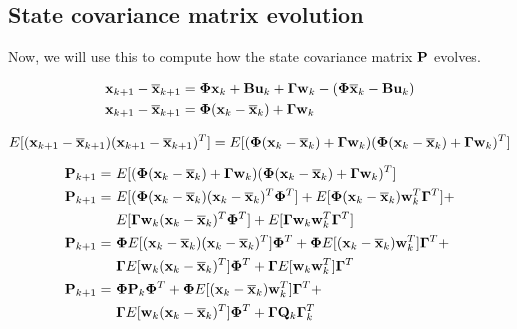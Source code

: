\subsection{State covariance matrix evolution}

Now, we will use this to compute how the \gls{state} covariance matrix $\mathbf{P}$
evolves.

\begin{align*}
  \mathbf{x}_{k+1} - \overline{\mathbf{x}}_{k+1} &= \mathbf{\Phi}\mathbf{x}_k +
    \mathbf{B}\mathbf{u}_k + \mathbf{\Gamma}\mathbf{w}_k - (\mathbf{\Phi}\overline{\mathbf{x}}_k -
    \mathbf{B}\mathbf{u}_k) \\
  \mathbf{x}_{k+1} - \overline{\mathbf{x}}_{k+1} &=
    \mathbf{\Phi}(\mathbf{x}_k - \overline{\mathbf{x}}_k) + \mathbf{\Gamma}\mathbf{w}_k
\end{align*}

\begin{equation*}
  E[(\mathbf{x}_{k+1} - \overline{\mathbf{x}}_{k+1})(\mathbf{x}_{k+1} - \overline{\mathbf{x}}_{k+1})^T] =
    E[(\mathbf{\Phi}(\mathbf{x}_k - \overline{\mathbf{x}}_k) + \mathbf{\Gamma}\mathbf{w}_k)
      (\mathbf{\Phi}(\mathbf{x}_k - \overline{\mathbf{x}}_k) + \mathbf{\Gamma}\mathbf{w}_k)^T]
\end{equation*}

\begin{align*}
  \mathbf{P}_{k+1} =~&
    E[(\mathbf{\Phi}(\mathbf{x}_k - \overline{\mathbf{x}}_k) + \mathbf{\Gamma}\mathbf{w}_k)
      (\mathbf{\Phi}(\mathbf{x}_k - \overline{\mathbf{x}}_k) + \mathbf{\Gamma}\mathbf{w}_k)^T] \\
  \mathbf{P}_{k+1} =~&
    E[(\mathbf{\Phi}(\mathbf{x}_k - \overline{\mathbf{x}}_k)(\mathbf{x}_k - \overline{\mathbf{x}}_k)^T
      \mathbf{\Phi}^T] +
    E[\mathbf{\Phi}(\mathbf{x}_k - \overline{\mathbf{x}}_k)\mathbf{w}_k^T\mathbf{\Gamma}^T] + \\
    &E[\mathbf{\Gamma}\mathbf{w}_k(\mathbf{x}_k - \overline{\mathbf{x}}_k)^T\mathbf{\Phi}^T] +
    E[\mathbf{\Gamma}\mathbf{w}_k\mathbf{w}_k^T\mathbf{\Gamma}^T] \\
  \mathbf{P}_{k+1} =~&
    \mathbf{\Phi}E[(\mathbf{x}_k - \overline{\mathbf{x}}_k)(\mathbf{x}_k - \overline{\mathbf{x}}_k)^T]
    \mathbf{\Phi}^T +
    \mathbf{\Phi}E[(\mathbf{x}_k - \overline{\mathbf{x}}_k)\mathbf{w}_k^T]\mathbf{\Gamma}^T + \\
    &\mathbf{\Gamma} E[\mathbf{w}_k(\mathbf{x}_k - \overline{\mathbf{x}}_k)^T]\mathbf{\Phi}^T +
    \mathbf{\Gamma} E[\mathbf{w}_k\mathbf{w}_k^T]\mathbf{\Gamma}^T \\
  \mathbf{P}_{k+1} =~& \mathbf{\Phi}\mathbf{P}_k\mathbf{\Phi}^T +
    \mathbf{\Phi}E[(\mathbf{x}_k - \overline{\mathbf{x}}_k)\mathbf{w}_k^T]\mathbf{\Gamma}^T + \\
    &\mathbf{\Gamma} E[\mathbf{w}_k(\mathbf{x}_k - \overline{\mathbf{x}}_k)^T]\mathbf{\Phi}^T +
    \mathbf{\Gamma}\mathbf{Q}_k\mathbf{\Gamma}_k^T
\end{align*}


